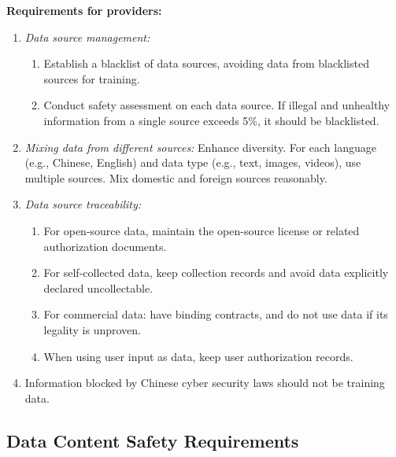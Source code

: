 \documentclass{article}
\begin{document}
\textbf{Requirements for providers:}
\begin{enumerate}
    \item \textit{Data source management:}
    \begin{enumerate}
        \item Establish a blacklist of data sources, avoiding data from blacklisted sources for training.
        \item Conduct safety assessment on each data source. If illegal and unhealthy information from a single source exceeds 5\%, it should be blacklisted.
    \end{enumerate}
    \item \textit{Mixing data from different sources:} Enhance diversity. For each language (e.g., Chinese, English) and data type (e.g., text, images, videos), use multiple sources. Mix domestic and foreign sources reasonably.
    \item \textit{Data source traceability:}
    \begin{enumerate}
        \item For open-source data, maintain the open-source license or related authorization documents.
        \item For self-collected data, keep collection records and avoid data explicitly declared uncollectable.
        \item For commercial data: have binding contracts, and do not use data if its legality is unproven.
        \item When using user input as data, keep user authorization records.
    \end{enumerate}
    \item Information blocked by Chinese cyber security laws should not be training data.
\end{enumerate}

\subsection{Data Content Safety Requirements}
\end{document}
